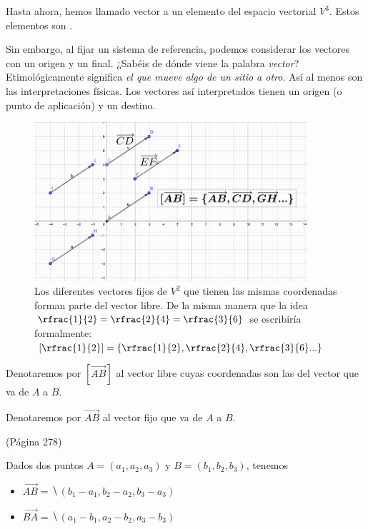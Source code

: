 
Hasta ahora, hemos llamado vector a un elemento del espacio vectorial $V^3$. 
%
Estos elementos son .

Sin embargo, al fijar un sistema de referencia, podemos considerar los vectores con un origen y un final. 
%
¿Sabéis de dónde viene la palabra \textit{vector}? 
%
Etimológicamente significa \emph{el que mueve algo de un sitio a otro}. 
%
Así al menos son las interpretaciones físicas. 
%
Los vectores así interpretados tienen un origen (o punto de aplicación) y un destino.

\begin{figure}[hptb]
    \centering
    \includegraphics[width=0.9\textwidth]{img/Fijos-libres.png}
    \caption{Los diferentes vectores fijos de $V^2$ que tienen las mismas coordenadas forman parte del vector libre. 
    \newline
    De la misma manera que la idea $\rfrac{1}{2}=\rfrac{2}{4}=\rfrac{3}{6}$ se escribiría formalmente: $\left[\rfrac{1}{2}\right] = \left\{\rfrac{1}{2},\rfrac{2}{4},\rfrac{3}{6} ... \right\}$}
    \label{fig:plano}
\end{figure}


Denotaremos por $[\vec{AB}]$ al vector libre cuyas coordenadas son las del vector que va de $A$ a $B$.

Denotaremos por $\vec{AB}$ al vector fijo que va de $A$ a $B$.





\begin{defn}
(Página 278)

Dados dos puntos $A=(a_1,a_2,a_3)$ y $B = (b_1,b_2,b_3)$, tenemos 
    \begin{itemize}
        \item $\vec{AB} = \hide{(b_1-a_1, b_2-a_2, b_3-a_3)}$
        \item $\vec{BA} = \hide{(a_1-b_1, a_2-b_2, a_3-b_3)}$ 
    \end{itemize}
\end{defn}

